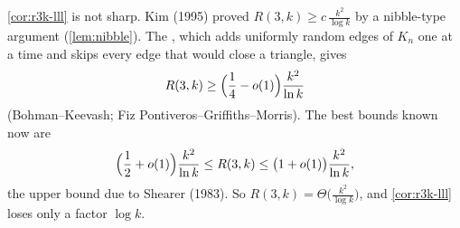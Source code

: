 \begin{remark}\label{rmk:r3k-current}
    \autoref{cor:r3k-lll} is not sharp. Kim (1995) proved \(R(3,k) \ge c \, \frac{k^{2}}{\log k}\) by a nibble-type argument (\autoref{lem:nibble}). The , which adds uniformly random edges of \(K_{n}\) one at a time and skips every edge that would close a triangle, gives
    \[
        R(3,k) \ge \Bigl( \frac{1}{4} - o(1) \Bigr) \frac{k^{2}}{\ln k}
    \]
    (Bohman--Keevash; Fiz Pontiveros--Griffiths--Morris). The best bounds known now are
    \[
        \Bigl( \frac{1}{2} + o(1) \Bigr) \frac{k^{2}}{\ln k} \le R(3,k) \le \bigl( 1 + o(1) \bigr) \frac{k^{2}}{\ln k},
    \]
    the upper bound due to Shearer (1983). So \(R(3,k) = \Theta\bigl( \frac{k^{2}}{\log k} \bigr)\), and \autoref{cor:r3k-lll} loses only a factor \(\log k\).
\end{remark}

